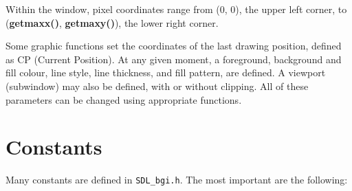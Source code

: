 \documentclass[a4paper,11pt]{article}
\newcommand{\func}[1]{\textbf{#1}}  %
\newcommand{\F}[1]{\texttt{#1}}     %
\begin{document}
Within the window, pixel coordinates range from (0, 0), the upper left
corner, to (\func{get\-maxx()}, \func{getmaxy()}), the lower right
corner.

Some graphic functions set the coordinates of the last drawing
position, defined as CP (Current Position). At any given moment, a
foreground, background and fill colour, line style, line thickness,
and fill pattern, are defined. A viewport (subwindow) may also be
defined, with or without clipping. All of these parameters can be
changed using appropriate functions.


\section{Constants}

Many constants are defined in \F{SDL\_bgi.h}. The most important are
the following:
\end{document}
